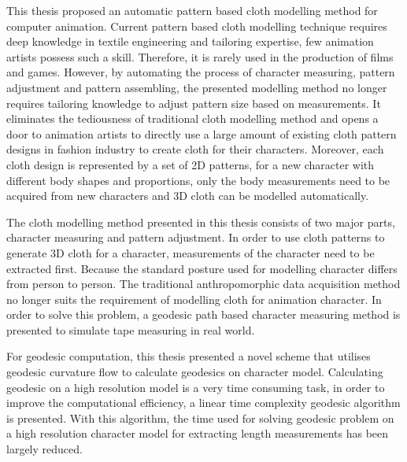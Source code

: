 This thesis proposed an automatic pattern based cloth modelling method for computer animation. Current pattern based cloth modelling technique requires deep knowledge in textile engineering and tailoring expertise, few animation artists possess such a skill. Therefore, it is rarely used in the production of films and games. However, by automating the process of character measuring, pattern adjustment and pattern assembling, the presented modelling method no longer requires tailoring knowledge to adjust pattern size based on measurements. It eliminates the tediousness of traditional cloth modelling method and opens a door to animation artists to directly use a large amount of existing cloth pattern designs in fashion industry to create cloth for their characters. Moreover, each cloth design is represented by a set of 2D patterns, for a new character with different body shapes and proportions, only the body measurements need to be acquired from new characters and 3D cloth can be modelled automatically. 

The cloth modelling method presented in this thesis consists of two major parts, character measuring and pattern adjustment. In order to use cloth patterns to generate 3D cloth for a character, measurements of the character need to be extracted first. Because the standard posture used for modelling character differs from person to person. The traditional anthropomorphic data acquisition method no longer suits the requirement of modelling cloth for animation character. In order to solve this problem, a geodesic path based character measuring method is presented to simulate tape measuring in real world.

For geodesic computation, this thesis presented a novel scheme that utilises geodesic curvature flow to calculate geodesics on character model. Calculating geodesic on a high resolution model is a very time consuming task, in order to improve the computational efficiency, a linear time complexity geodesic algorithm is presented. With this algorithm, the time used for solving geodesic problem on a high resolution character model for extracting length measurements has been largely reduced.

